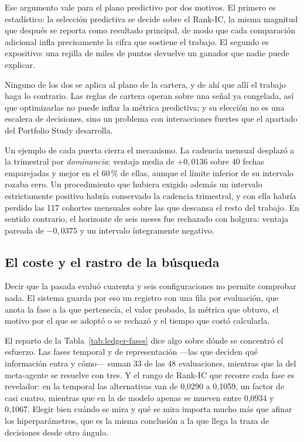 Ese argumento vale para el plano predictivo por dos motivos. El primero es estadístico: la
selección predictiva se decide sobre el Rank-IC, la misma magnitud que después se reporta como
resultado principal, de modo que cada comparación adicional infla precisamente la cifra que sostiene
el trabajo. El segundo es expositivo: una rejilla de miles de puntos devuelve un ganador que nadie
puede explicar.

Ninguno de los dos se aplica al plano de la cartera, y de ahí que allí el trabajo haga lo
contrario. Las reglas de cartera operan sobre una señal ya congelada, así que optimizarlas no puede
inflar la métrica predictiva; y su elección no es una escalera de decisiones, sino un problema con
interacciones fuertes que el apartado del Portfolio Study desarrolla.

Un ejemplo de cada puerta cierra el mecanismo. La cadencia mensual desplazó a la trimestral por
\emph{dominancia}: ventaja media de $+0{,}0136$ sobre 40 fechas emparejadas y mejor en el 60\,\% de
ellas, aunque el límite inferior de su intervalo rozaba cero. Un procedimiento que hubiera exigido
además un intervalo estrictamente positivo habría conservado la cadencia trimestral, y con ella
habría perdido las 117 cohortes mensuales sobre las que descansa el resto del trabajo. En sentido
contrario, el horizonte de seis meses fue rechazado con holgura: ventaja pareada de $-0{,}0375$ y un
intervalo íntegramente negativo.

\subsection{El coste y el rastro de la búsqueda}

Decir que la pasada evaluó cuarenta y seis configuraciones no permite comprobar nada. El sistema
guarda por eso un registro con una fila por evaluación, que anota la fase a la que pertenecía, el
valor probado, la métrica que obtuvo, el motivo por el que se adoptó o se rechazó y el tiempo que
costó calcularla.

\begin{table}[htbp]
  \centering
  \small
  \caption{Lo que costó recorrer el catálogo, por fase del protocolo.}
  \label{tab:ledger-fases}
  
  \caption*{Las evaluaciones incluyen al valor vigente de cada comparación, que se mide de nuevo en
  cada fase; de ahí que sean 48 y no 46.}
\end{table}

El reparto de la Tabla~\ref{tab:ledger-fases} dice algo sobre dónde se concentró el esfuerzo. Las
fases temporal y de representación ---las que deciden qué información entra y cómo--- suman 33 de las
48 evaluaciones, mientras que la del meta-agente se resuelve con tres. Y el rango de Rank-IC que
recorre cada fase es revelador: en la temporal las alternativas van de 0,0290 a 0,1059, un factor de
casi cuatro, mientras que en la de modelo apenas se mueven entre 0,0934 y 0,1067. Elegir bien cuándo
se mira y qué se mira importa mucho más que afinar los hiperparámetros, que es la misma conclusión a
la que llega la traza de decisiones desde otro ángulo.

